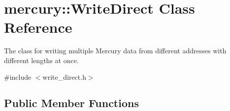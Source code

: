 \hypertarget{classmercury_1_1_write_direct}{}\section{mercury\+:\+:Write\+Direct Class Reference}
\label{classmercury_1_1_write_direct}


The class for writing multiple Mercury data from different addresses with different lengths at once.  




{\ttfamily \#include $<$write\+\_\+direct.\+h$>$}

\subsection*{Public Member Functions}
